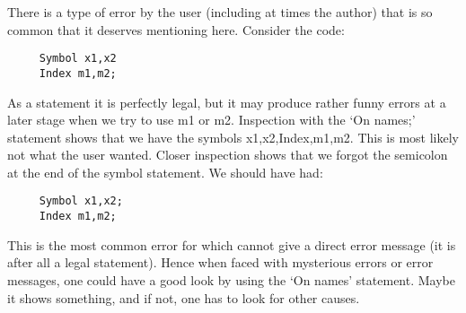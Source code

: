 There is a type of error by the user (including at 
times the author) that is so common that it deserves mentioning here. 
Consider the code:
\begin{verbatim}
     Symbol x1,x2
     Index m1,m2;
\end{verbatim}
As a statement it is perfectly legal, but it may produce 
rather funny errors at a later stage when we try to use m1 or m2. 
Inspection with the `On names;' statement shows that we have the symbols 
x1,x2,Index,m1,m2. This is most likely not what the user wanted. Closer 
inspection shows that we forgot the semicolon at the end of the symbol 
statement. We should have had:
\begin{verbatim}
     Symbol x1,x2;
     Index m1,m2;
\end{verbatim}
This is the most common error for which {\FORM} cannot give a direct error 
message (it is after all a legal statement). Hence when faced with 
mysterious errors or error messages, one could have a good look by using 
the `On names' statement. Maybe it shows something, and if not, one has to 
look for other causes.
